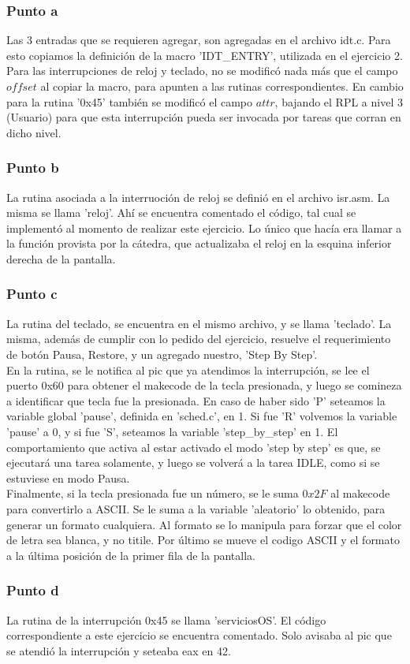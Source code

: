 \subsubsection* {Punto a}
Las 3 entradas que se requieren agregar, son agregadas en el archivo idt.c. Para esto copiamos la definición de la macro 'IDT\_ENTRY', utilizada en el ejercicio 2. Para las interrupciones de reloj y teclado, no se modificó nada más que el campo $offset$ al copiar la macro, para apunten a las rutinas correspondientes. En cambio para la rutina '0x45' también se modificó el campo $attr$, bajando el RPL a nivel 3 (Usuario) para que esta interrupción pueda ser invocada por tareas que corran en dicho nivel.

\subsubsection* {Punto b}
La rutina asociada a la interruoción de reloj se definió en el archivo isr.asm. La misma se llama 'reloj'. Ahí se encuentra comentado el código, tal cual se implementó al momento de realizar este ejercicio. Lo único que hacía era llamar a la función provista por la cátedra, que actualizaba el reloj en la esquina inferior derecha de la pantalla.


\subsubsection* {Punto c}
La rutina del teclado, se encuentra en el mismo archivo, y se llama 'teclado'. La misma, además de cumplir con lo pedido del ejercicio, resuelve el requerimiento de botón Pausa, Restore, y un agregado nuestro, 'Step By Step'. \\

En la rutina, se le notifica al pic que ya atendimos la interrupción, se lee el puerto 0x60 para obtener el makecode de la tecla presionada, y luego se comineza a identificar que tecla fue la presionada. En caso de haber sido 'P' seteamos la variable global 'pause', definida en 'sched.c', en 1. Si fue 'R' volvemos la variable 'pause' a 0, y si fue 'S', seteamos la variable 'step\_by\_step' en 1. El comportamiento que activa al estar activado el modo 'step by step' es que, se ejecutará una tarea solamente, y luego se volverá a la tarea IDLE, como si se estuviese en modo Pausa.\\

Finalmente, si la tecla presionada fue un número, se le suma $0x2F$ al makecode para convertirlo a ASCII. Se le suma a la variable 'aleatorio' lo obtenido, para generar un formato cualquiera. Al formato se lo manipula para forzar que el color de letra sea blanca, y no titile. Por último se mueve el codigo ASCII y el formato a la última posición de la primer fila de la pantalla.

\subsubsection* {Punto d}
La rutina de la interrupción 0x45 se llama 'serviciosOS'. El código correspondiente a este ejercicio se encuentra comentado. Solo avisaba al pic que se atendió la interrupción y seteaba eax en 42.